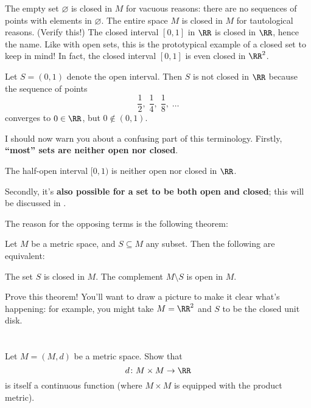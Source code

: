 \begin{example}
	\listhack
	\begin{enumerate}[(a)]
		\ii The empty set $\varnothing$ is closed in $M$ for vacuous reasons:
		there are no sequences of points with elements in $\varnothing$.
		\ii The entire space $M$ is closed in $M$ for tautological reasons.
		(Verify this!)
		\ii The closed interval $[0,1]$ in $\RR$ is closed in $\RR$, hence the name.  Like with open sets, this is the prototypical example of a closed set to keep in mind!
		\ii In fact, the closed interval $[0,1]$ is even closed in $\RR^2$.
	\end{enumerate}
\end{example}
\begin{example}
	Let $S=(0,1)$ denote the open interval.
	Then $S$ is not closed in $\RR$
	because the sequence of points
	\[
		\frac12, \;
		\frac14, \;
		\frac18, \;
		\dots
	\]
	converges to $0 \in \RR$, but $0 \notin (0,1)$.
\end{example}

I should now warn you about a confusing part of this terminology.
Firstly, \textbf{``most'' sets are neither open nor closed}.
\begin{example}
	The half-open interval $[0,1)$ %
	is neither open nor closed in $\RR$.
\end{example}
Secondly, it's \textbf{also possible for a set to be both open and closed};
this will be discussed in .

The reason for the opposing terms is the following theorem:
\begin{theorem}
	Let $M$ be a metric space, and $S \subseteq M$ any subset.
	Then the following are equivalent:
	\begin{itemize}
		\ii The set $S$ is closed in $M$.
		\ii The complement $M \setminus S$ is open in $M$.
	\end{itemize}
\end{theorem}
\begin{exercise}
	[Great]
	Prove this theorem!
	You'll want to draw a picture to make it clear what's happening:
	for example, you might take $M = \RR^2$ and $S$ to be the closed unit disk.
\end{exercise}

\section{\problemhead}
\begin{problem}
	Let $M = (M,d)$ be a metric space.
	Show that \[ d \colon M \times M \to \RR \]
	is itself a continuous function
	(where $M \times M$ is equipped with the product metric).
\end{problem}

